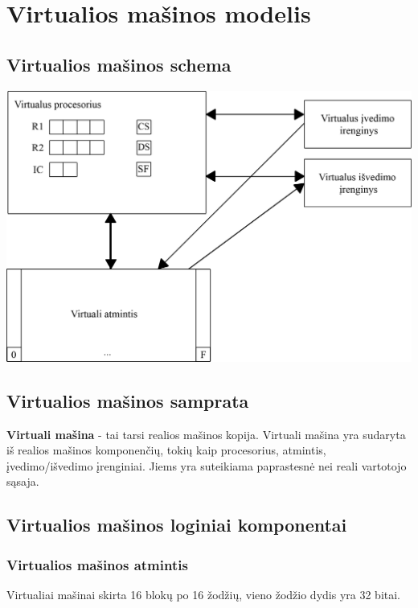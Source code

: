 \section{Virtualios mašinos modelis}
	\subsection{Virtualios mašinos schema}
	\includegraphics{kita/VM.png}
	\subsection{Virtualios mašinos samprata}
	\textbf{Virtuali mašina} - tai tarsi realios mašinos kopija. Virtuali mašina yra sudaryta iš realios mašinos komponenčių, tokių kaip procesorius, atmintis, įvedimo/išvedimo įrenginiai. Jiems yra suteikiama paprastesnė nei reali vartotojo sąsaja.
	
	\subsection{Virtualios mašinos loginiai komponentai}
	\subsubsection{Virtualios mašinos atmintis}
	Virtualiai mašinai skirta 16 blokų po 16 žodžių, vieno žodžio dydis yra 32 bitai.
